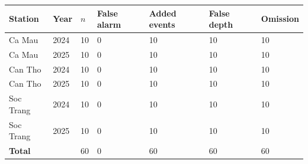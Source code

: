 
\begin{tabular}{@{}p{1.5cm}p{0.75cm}p{0.35cm}p{1.25cm}p{1.25cm}p{1.2cm}p{1.2cm}@{}}
\toprule
Station & Year & $n$ & False alarm & Added events & False depth & Omission \\
\midrule
Ca Mau & 2024 & 10 & 0 & 10 & 10 & 10 \\
Ca Mau & 2025 & 10 & 0 & 10 & 10 & 10 \\
Can Tho & 2024 & 10 & 0 & 10 & 10 & 10 \\
Can Tho & 2025 & 10 & 0 & 10 & 10 & 10 \\
Soc Trang & 2024 & 10 & 0 & 10 & 10 & 10 \\
Soc Trang & 2025 & 10 & 0 & 10 & 10 & 10 \\
\midrule
\textbf{Total} & & 60 & 0 & 60 & 60 & 60 \\
\bottomrule
\end{tabular}
